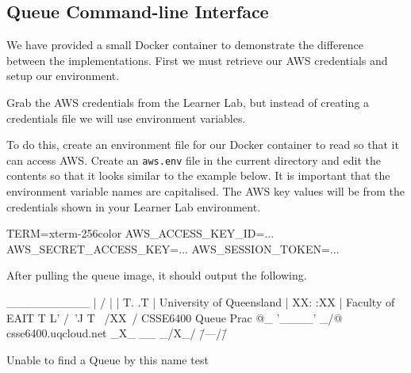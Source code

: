\documentclass{csse4400}
\begin{document}

\subsection{Queue Command-line Interface}\label{sec:q-cli}

We have provided a small Docker container to demonstrate the difference between the implementations.
First we must retrieve our AWS credentials and setup our environment.

Grab the AWS credentials from the Learner Lab,
but instead of creating a credentials file we will use environment variables.

To do this, create an environment file for our Docker container to read so that it can access AWS.
Create an \texttt{aws.env} file in the current directory and edit the contents so that it looks similar to the example below.
It is important that the environment variable names are capitalised.
The AWS key values will be from the credentials shown in your Learner Lab environment.

\begin{code}[numbers=none]{}
TERM=xterm-256color
AWS_ACCESS_KEY_ID=...
AWS_SECRET_ACCESS_KEY=...
AWS_SESSION_TOKEN=...
\end{code}


After pulling the queue image, it should output the following.

\begin{code}[numbers=none,keepspaces=true]{}


  __________
 |   \XX/   |
 | T. \/ .T |      University of Queensland
 | XX:  :XX |          Faculty of EAIT
 T L' /\ 'J T
  \  /XX\  /         CSSE6400 Queue Prac
@\_ '____' _/@       csse6400.uqcloud.net
\_X\_ __ _/X_/
 \=/\----/\=/



Unable to find a Queue by this name test
\end{code}
\end{document}
